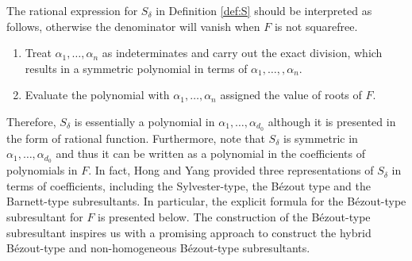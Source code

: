 \documentclass{article}
\begin{document}
The rational expression for $S_{\delta}$ in Definition \ref{def:S} should  be interpreted as follows, otherwise the denominator will vanish when $F$ is not squarefree.
\begin{enumerate}[(1)]
\item Treat $\alpha_1,\ldots,\alpha_n$ as indeterminates and carry out the exact division, which results in a symmetric polynomial in terms of $\alpha_1,\ldots,,\alpha_{n}$.

\item Evaluate the polynomial with $\alpha_1,\ldots,\alpha_n$  assigned the value of roots of $F$.
\end{enumerate}
Therefore, ${S_\delta }$ is essentially a polynomial in $\alpha_1,\ldots,\alpha_{d_0}$ although it is presented in the form of rational function.
Furthermore, note that ${S_\delta }$ is symmetric in $\alpha_1,\ldots,\alpha_{d_0}$ and thus it can be written as a polynomial in the coefficients of polynomials in $F$. In fact, Hong and Yang provided three representations of ${S_\delta }$ in terms of coefficients, including the Sylvester-type, the B\'ezout type and the Barnett-type subresultants. In particular,  the explicit formula for the B\'ezout-type subresultant for $F$ is presented below. The construction of the B\'ezout-type subresultant inspires us with a promising approach to construct the hybrid B\'ezout-type and non-homogeneous B\'ezout-type subresultants.
\end{document}
